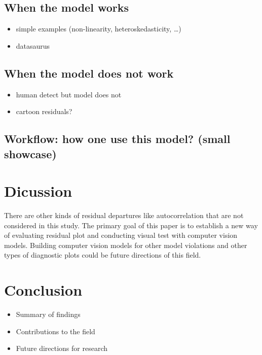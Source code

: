 \documentclass[]{interact}
\theoremstyle{plain}%
\theoremstyle{definition}
\theoremstyle{remark}
\providecommand{\tightlist}{%
  \setlength{\itemsep}{0pt}\setlength{\parskip}{0pt}}
\def\tightlist{}
\begin{document}
\hypertarget{when-the-model-works}{%
\subsection{When the model works}\label{when-the-model-works}}

\begin{itemize}
\tightlist
\item
  simple examples (non-linearity, heteroskedasticity, \ldots)
\item
  datasaurus
\end{itemize}

\hypertarget{when-the-model-does-not-work}{%
\subsection{When the model does not
work}\label{when-the-model-does-not-work}}

\begin{itemize}
\tightlist
\item
  human detect but model does not
\item
  cartoon residuals?
\end{itemize}

\hypertarget{workflow-how-one-use-this-model-small-showcase}{%
\subsection{Workflow: how one use this model? (small
showcase)}\label{workflow-how-one-use-this-model-small-showcase}}

\hypertarget{dicussion}{%
\section{Dicussion}\label{dicussion}}

There are other kinds of residual departures like autocorrelation that
are not considered in this study. The primary goal of this paper is to
establish a new way of evaluating residual plot and conducting visual
test with computer vision models. Building computer vision models for
other model violations and other types of diagnostic plots could be
future directions of this field.

\hypertarget{conclusion}{%
\section{Conclusion}\label{conclusion}}

\begin{itemize}
\tightlist
\item
  Summary of findings
\item
  Contributions to the field
\item
  Future directions for research
\end{itemize}



\end{document}
